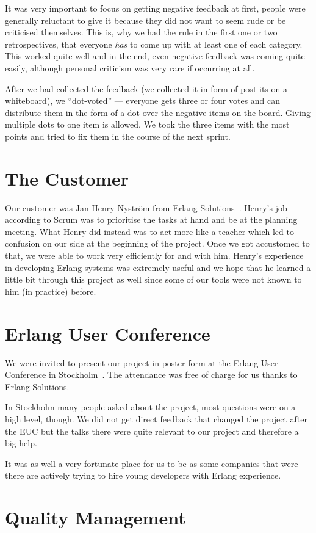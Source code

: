 \documentclass[11pt,a4paper]{report}
\begin{document}
It was very important to focus on getting negative feedback at first, people
were generally reluctant to give it because they did not want to seem rude or
be criticised themselves. This is, why we had the rule in the first one or two
retrospectives, that everyone {\em has\/} to come up with at least one of each
category. This worked quite well and in the end, even negative feedback was
coming quite easily, although personal criticism was very rare if occurring at
all.

After we had collected the feedback (we collected it in form of post-its on a
whiteboard), we ``dot-voted'' --- everyone gets three or four votes and can
distribute them in the form of a dot over the negative items on the board.
Giving multiple dots to one item is allowed. We took the three items with the
most points and tried to fix them in the course of the next sprint.

\section{The Customer}
Our customer was Jan Henry Nyström from Erlang Solutions~\cite{erlsol}. Henry's
job according to Scrum was to prioritise the tasks at hand and be at the
planning meeting. What Henry did instead was to act more like a teacher which
led to confusion on our side at the beginning of the project. Once we got
accustomed to that, we were able to work very efficiently for and with him.
Henry's experience in developing Erlang systems was extremely useful and we hope
that he learned a little bit through this project as well since some of our
tools were not known to him (in practice) before.
\section{Erlang User Conference}
We were invited to present our project in poster form at the Erlang User
Conference in Stockholm~\cite{euc2011}. The attendance was free of charge for us
thanks to Erlang Solutions.

In Stockholm many people asked about the project, most questions were on a high
level, though. We did not get direct feedback that changed the project after the
EUC but the talks there were quite relevant to our project and therefore a big
help.

It was as well a very fortunate place for us to be as some companies that were
there are actively trying to hire young developers with Erlang experience.

\section{Quality Management}
\end{document}
